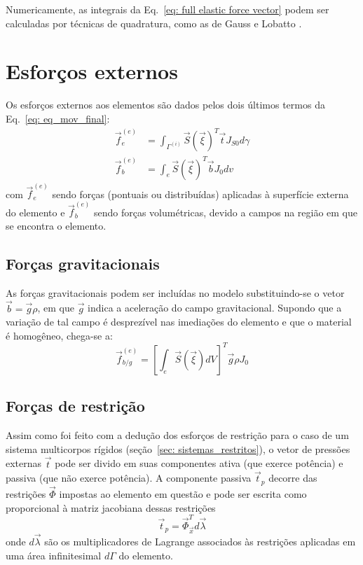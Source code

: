 Numericamente, as integrais da Eq.~\eqref{eq: full elastic force vector} podem ser calculadas por técnicas de quadratura, como as de Gauss e Lobatto \cite{gerstmayr_efficient_2005}.

\section{Esforços externos}
Os esforços externos aos elementos são dados pelos dois últimos termos da Eq.~\eqref{eq: eq_mov_final}:
\begin{align}
     \vec{f}_{e}^{(e)} &= \int_{\Gamma^{(i)}}{\vec{S}(\vec{\xi})^T \vec{t} J_{S0} d\gamma} \\
     \vec{f}_{b}^{(e)} &= \int_{e}{\vec{S}(\vec{\xi})^T \vec{b} J_{0} dv}
\end{align}
com $\vec{f}_{e}^{(e)} $ sendo forças (pontuais ou distribuídas) aplicadas à superfície externa do elemento e $\vec{f}_{b}^{(e)}$ sendo forças
volumétricas, devido a campos na região em que se encontra o elemento.

\subsection{Forças gravitacionais}
    As forças gravitacionais podem ser incluídas no modelo substituindo-se o vetor $\vec{b}=\vec{g}\rho$, 
em que $\vec{g}$ indica a aceleração do campo gravitacional. Supondo que a variação de tal campo é desprezível
nas imediações do elemento e que o material é homogêneo, chega-se a:
\begin{equation}
    \vec{f}_{b/g}^{(e)} = \left[\int_{e}{\vec{S}(\vec{\xi})dV }\right]^T \vec{g} \rho J_0
\end{equation}

\subsection{Forças de restrição}
    Assim como foi feito com a dedução dos esforços de restrição para o caso de um sistema  multicorpos rígidos (seção~\ref{sec: sistemas_restritos}),
o vetor de pressões externas $\vec{t}$ pode ser divido em suas componentes ativa (que exerce potência) e passiva (que não exerce potência). A componente
passiva $\vec{t}_p$ decorre das restrições $\vec{\Phi}$ impostas ao elemento em questão e pode ser escrita como proporcional à matriz jacobiana dessas restrições
\begin{equation}
    \vec{t}_p = \vec{\Phi}_{\vec{x}}^T d\vec{\lambda}
\end{equation}
onde $d\vec{\lambda}$ são os multiplicadores de Lagrange associados às restrições aplicadas em uma área infinitesimal $d\Gamma$ do elemento.

